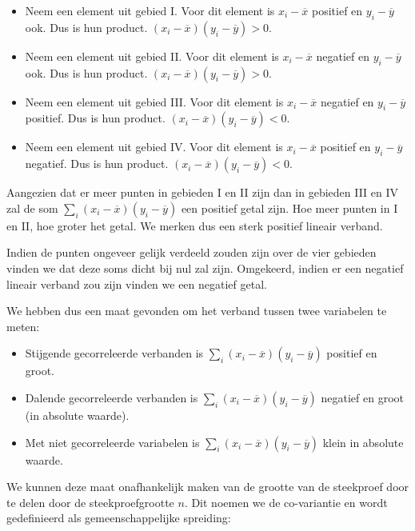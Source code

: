 \begin{itemize}
  \item Neem een element uit gebied I. Voor dit element is $x_{i} - \overline{x}$ positief en $y_{i} - \overline{y}$ ook. Dus is hun product. $(x_{i} - \overline{x}) (y_{i} - \overline{y}) > 0$.
  \item Neem een element uit gebied II. Voor dit element is $x_{i} - \overline{x}$ negatief en $y_{i} - \overline{y}$ ook. Dus is hun product. $(x_{i} - \overline{x}) (y_{i} - \overline{y}) > 0$.
  \item Neem een element uit gebied III. Voor dit element is $x_{i} - \overline{x}$ negatief en $y_{i} - \overline{y}$ positief. Dus is hun product. $(x_{i} - \overline{x}) (y_{i} - \overline{y}) < 0$.
  \item Neem een element uit gebied IV. Voor dit element is $x_{i} - \overline{x}$ positief en $y_{i} - \overline{y}$ negatief. Dus is hun product. $(x_{i} - \overline{x}) (y_{i} - \overline{y}) < 0$.
\end{itemize}

Aangezien dat er meer punten in gebieden I en II zijn dan in gebieden III en IV zal de som $\sum_{i} (x_{i} - \overline{x}) (y_{i} - \overline{y})$ een positief getal zijn. Hoe meer punten in I en II, hoe groter het getal. We merken dus een sterk positief lineair verband.

Indien de punten ongeveer gelijk verdeeld zouden zijn over de vier gebieden vinden we dat deze soms dicht bij nul zal zijn. Omgekeerd, indien er een negatief lineair verband zou zijn vinden we een negatief getal.

We hebben dus een maat gevonden om het verband tussen twee variabelen te meten:

\begin{itemize}
  \item Stijgende gecorreleerde verbanden is $\sum_{i} (x_{i} - \overline{x}) (y_{i} - \overline{y})$ positief en groot.
  \item Dalende gecorreleerde verbanden is $\sum_{i} (x_{i} - \overline{x}) (y_{i} - \overline{y})$ negatief en groot (in absolute waarde).
  \item Met niet gecorreleerde variabelen is $\sum_{i} (x_{i} - \overline{x}) (y_{i} - \overline{y})$ klein in absolute waarde.
\end{itemize}

We kunnen deze maat onafhankelijk maken van de grootte van de steekproef door te delen door de steekproefgrootte $n$. Dit noemen we de co-variantie en wordt gedefinieerd als gemeenschappelijke spreiding:

